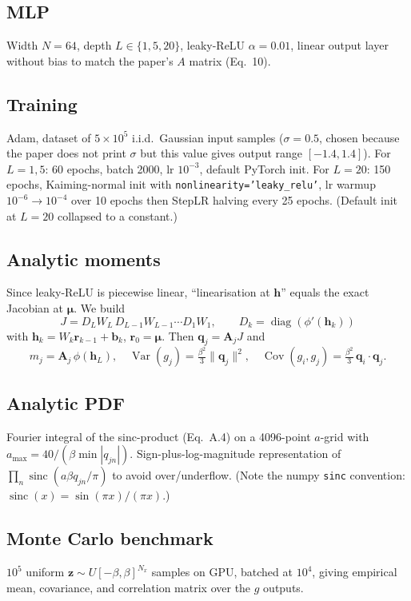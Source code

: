 \documentclass[11pt]{article}
\begin{document}
\subsection{MLP}
Width $N{=}64$, depth $L \in \{1, 5, 20\}$, leaky-ReLU $\alpha=0.01$, linear output layer without bias to match the paper's $A$ matrix (Eq.\ 10).

\subsection{Training}
Adam, dataset of $5\times10^5$ i.i.d.\ Gaussian input samples ($\sigma{=}0.5$, chosen because the paper does not print $\sigma$ but this value gives output range $[-1.4,1.4]$). For $L{=}1, 5$: 60 epochs, batch 2000, lr $10^{-3}$, default PyTorch init. For $L{=}20$: 150 epochs, Kaiming-normal init with \texttt{nonlinearity='leaky\_relu'}, lr warmup $10^{-6}\to 10^{-4}$ over 10 epochs then StepLR halving every 25 epochs. (Default init at $L{=}20$ collapsed to a constant.)

\subsection{Analytic moments}
Since leaky-ReLU is piecewise linear, ``linearisation at $\mathbf{h}$'' equals the exact Jacobian at $\boldsymbol{\mu}$. We build
\[
  J = D_L W_L\, D_{L-1} W_{L-1} \cdots D_1 W_1, \qquad D_k = \operatorname{diag}(\phi'(\mathbf{h}_k))
\]
with $\mathbf{h}_k = W_k \mathbf{r}_{k-1} + \mathbf{b}_k$, $\mathbf{r}_0 = \boldsymbol{\mu}$. Then $\mathbf{q}_j = \mathbf{A}_j J$ and
\[
  m_j = \mathbf{A}_j\,\phi(\mathbf{h}_L), \quad
  \operatorname{Var}(g_j) = \tfrac{\beta^2}{3}\|\mathbf{q}_j\|^2, \quad
  \operatorname{Cov}(g_i,g_j) = \tfrac{\beta^2}{3}\, \mathbf{q}_i \cdot \mathbf{q}_j.
\]

\subsection{Analytic PDF}
Fourier integral of the sinc-product (Eq.\ A.4) on a 4096-point $a$-grid with $a_{\max}=40/(\beta \min |q_{jn}|)$. Sign-plus-log-magnitude representation of $\prod_n \operatorname{sinc}(a\beta q_{jn}/\pi)$ to avoid over/underflow. (Note the numpy \texttt{sinc} convention: $\operatorname{sinc}(x) = \sin(\pi x)/(\pi x)$.)

\subsection{Monte Carlo benchmark}
$10^5$ uniform $\mathbf{z} \sim U[-\beta,\beta]^{N_x}$ samples on GPU, batched at $10^4$, giving empirical mean, covariance, and correlation matrix over the $g$ outputs.
\end{document}
